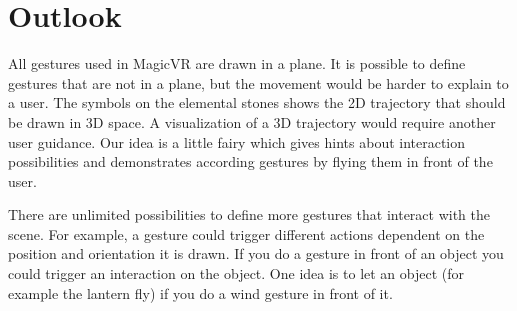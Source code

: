 \section{Outlook}

All gestures used in MagicVR are drawn in a plane.
It is possible to define gestures that are not in a plane, but the movement would be harder to explain to a user.
The symbols on the elemental stones shows the 2D trajectory that should be drawn in 3D space.
A visualization of a 3D trajectory would require another user guidance.
Our idea is a little fairy which gives hints about interaction possibilities and demonstrates according gestures by flying them in front of the user.

There are unlimited possibilities to define more gestures that interact with the scene.
For example, a gesture could trigger different actions dependent on the position and orientation it is drawn.
If you do a gesture in front of an object you could trigger an interaction on the object.
One idea is to let an object (for example the lantern fly) if you do a wind gesture in front of it.